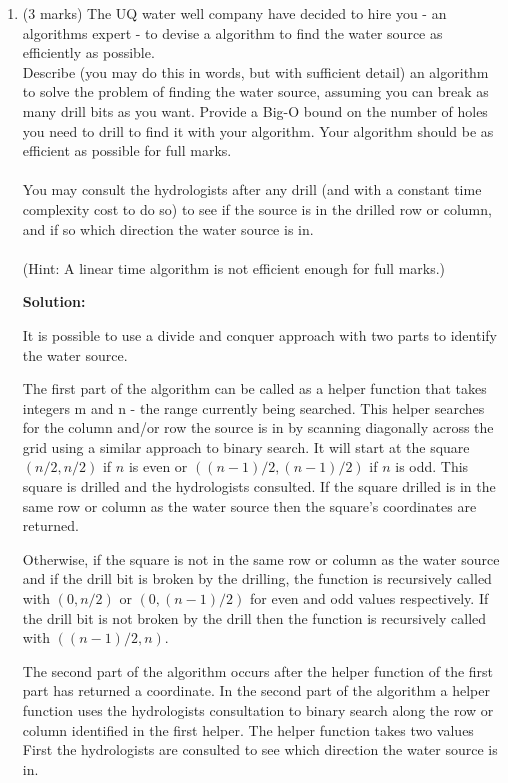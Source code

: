 \documentclass[a4,13pt]{extarticle}
\newenvironment{Solution}{\color{blue}\textbf{Solution:}}{}
\begin{document}
\begin{enumerate}
	      \begin{enumerate} 
	      	\item (3 marks) The UQ water well company have decided to hire you - an algorithms expert - to devise a algorithm 
	      	      to find the water source as efficiently as possible. \\
	      	      	      	              
	      	      Describe (you may do this in words, but with sufficient detail) an algorithm to solve the problem of finding the water source, 
	      	      assuming you can break as many drill bits as you want. Provide a Big-O bound on the number of holes you need to drill to find 
	      	      it with your algorithm. Your algorithm should be as efficient as possible for full marks.\\\\
	      	      You may consult the hydrologists after any drill (and with a constant time complexity cost to do so) to see if 
	      	      the source is in the drilled row or column, and if so which direction the water source is in.\\\\
	      	      (Hint: A linear time algorithm is not efficient enough for full marks.)
	      	      
			\begin{Solution}

				It is possible to use a divide and conquer approach with two parts to identify the water source. 
				
				The first part of the algorithm can be called as a helper function that takes integers m and n - the range currently being searched. This helper searches for the column and/or row the source is in by scanning diagonally across the grid using a similar approach to binary search. It will start at the square $(n/2, n/2)$ if $n$ is even or $((n - 1)/2, (n - 1)/2)$ if $n$ is odd. This square is drilled and the hydrologists consulted. If the square drilled is in the same row or column as the water source then the square's coordinates are returned. 
				
				Otherwise, if the square is not in the same row or column as the water source and if the drill bit is broken by the drilling, the function is recursively called with $(0, n/2)$ or $(0, (n - 1)/2)$ for even and odd values respectively. If the drill bit is not broken by the drill then the function is recursively called with $((n - 1)/2, n)$. 

				The second part of the algorithm occurs after the helper function of the first part has returned a coordinate. In the second part of the algorithm a helper function uses the hydrologists consultation to binary search along the row or column identified in the first helper. The helper function takes two values First the hydrologists are consulted to see which direction the water source is in.


\end{Solution}
\end{enumerate}
\end{enumerate}
\end{document}
